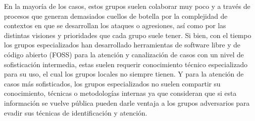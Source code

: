 \documentclass[12pt]{caltech_thesis}
\begin{document}
En la mayoría de los casos, estos grupos suelen colaborar muy poco y a través de procesos que generan demasiados cuellos de botella por la complejidad de contextos en que se desarrollan los ataques o agresiones, así como por las distintas visiones y prioridades que cada grupo suele tener. Si bien, con el tiempo los grupos especializados han desarrollado herramientas de software libre  y de código abierto  (FOSS)  para la atención y canalización de casos con un nivel de sofisticación intermedia, estas suelen requerir conocimiento técnico especializado para su uso, el cual los grupos locales no siempre tienen. Y para la atención de casos más sofisticados, los grupos especializados no suelen compartir su conocimiento, técnicas o metodologías internas ya que consideran que si esta información se vuelve pública pueden darle ventaja a los grupos adversarios para evadir sus técnicas de identificación y atención.






\end{document}
